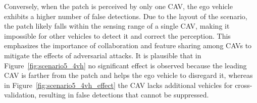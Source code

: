 Conversely, when the patch is perceived by only one CAV, the ego vehicle exhibits a higher number of false detections. Due to the layout of the scenario, the patch likely falls within the sensing range of a single CAV, making it impossible for other vehicles to detect it and correct the perception. This emphasizes the importance of collaboration and feature sharing among CAVs to mitigate the effects of adversarial attacks. It is plausible that in Figure~\ref{fig:scenario5_4vh} no significant effect is observed because the leading CAV is farther from the patch and helps the ego vehicle to disregard it, whereas in Figure~\ref{fig:scenario5_4vh_effect} the CAV lacks additional vehicles for cross-validation, resulting in false detections that cannot be suppressed.
